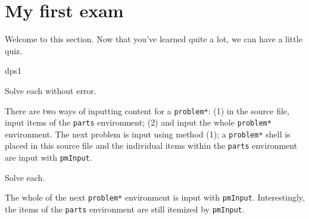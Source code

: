 \documentclass{article}
\title[\sExam]{\Exam}
\author{Dr.\ D. P. Story}
\date{\thisterm, \the\year}
\let\env\texttt
\def\cs#1{\texttt{\eqbs#1}}
\begin{document}
\maketitle

\section{My first exam}

Welcome to this section. Now that you've learned quite a lot, we can have
a little quiz.


\begin{exam}{dps1}
\begin{instructions}
Solve each without error.
\end{instructions}



\begin{eqComments}
There are two ways of inputting content for a \env{problem*}: (1) in the source file, input items
of the \env{parts} environment; (2) and input the whole \env{problem*} environment. The next problem
is input using method (1); a \env{problem*} shell is placed in this source file and the individual items
within the \env{parts} environment are input with \cs{pmInput}.
\end{eqComments}

\begin{problem*}[5ea]
Solve each.
\begin{parts}
\end{parts}
\end{problem*}

\begin{eqComments}
The whole of the next \env{problem*} environment is input with \cs{pmInput}. Interestingly, the items
of the \env{parts} environment are still itemized by \cs{pmInput}.
\end{eqComments}


\end{exam}
\end{document}
